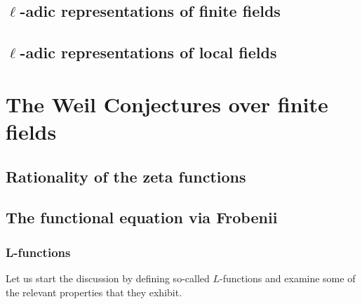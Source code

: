         \subsection{\texorpdfstring{$\ell$}{}-adic representations of finite fields}
        
        \subsection{\texorpdfstring{$\ell$}{}-adic representations of local fields}
    
    \section{The Weil Conjectures over finite fields}
        \subsection{Rationality of the zeta functions}
        
        \subsection{The functional equation via Frobenii}
            \subsubsection{L-functions}
                Let us start the discussion by defining so-called $L$-functions  and examine some of the relevant properties that they exhibit. 
                    
